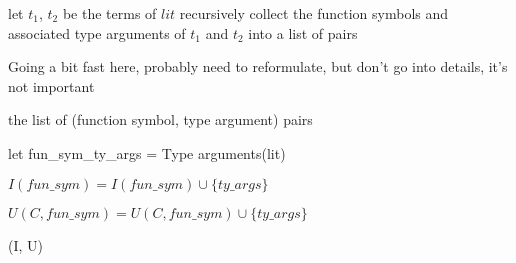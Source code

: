\documentclass{article}
\begin{document}
\begin{algorithm}
\begin{algorithmic}[1]

   \State let \(t_1\), \(t_2\) be the terms of \(lit\)
   \State recursively collect the function symbols and associated type arguments of \(t_1\) and \(t_2\) into a list of pairs

   \State \Comment Going a bit fast here, probably need to reformulate, but don't go into details, it's not important

   \State \Return the list of (function symbol, type argument) pairs

\EndFunction
\end{algorithmic}
\end{algorithm}


\begin{algorithm}
\begin{algorithmic}[1]
         \State let fun\_sym\_ty\_args = Type arguments(lit)

            \State \(I(fun\_sym) = I(fun\_sym) \cup \{ty\_args\}\)

         \Else

            \State \(U(C, fun\_sym) = U(C, fun\_sym) \cup \{ty\_args\}\)

         \EndIf
         \EndFor
      \EndFor
   \EndFor

   \State \Return (I, U)

\EndFunction
\end{algorithmic}
\end{algorithm}
\end{document}
